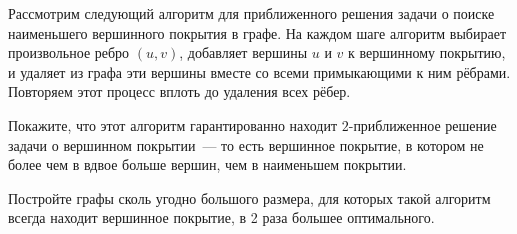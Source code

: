 Рассмотрим следующий алгоритм для приближенного решения задачи о поиске наименьшего вершинного покрытия в
графе. На каждом шаге алгоритм выбирает произвольное ребро $(u, v)$, добавляет вершины $u$ и $v$ к
вершинному покрытию, и удаляет из графа эти вершины вместе со всеми примыкающими к ним рёбрами. Повторяем
этот процесс вплоть до удаления всех рёбер.
\begin{enumcyr}
    \item Покажите, что этот алгоритм гарантированно находит $2$-приближенное решение задачи о вершинном
        покрытии~--- то есть вершинное покрытие, в котором не более чем в вдвое больше вершин, чем в
        наименьшем покрытии.
    \item Постройте графы сколь угодно большого размера, для которых такой алгоритм всегда находит
        вершинное покрытие, в 2 раза большее оптимального.
\end{enumcyr}

